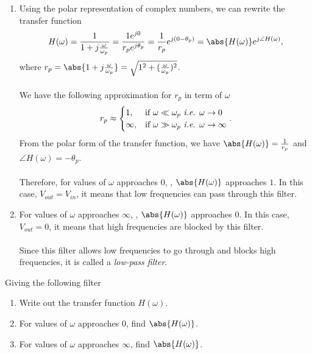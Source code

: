 \begin{enumerate}
{\begin{enumerate}
  \item Using the polar representation of complex numbers, we can rewrite the transfer function
    \[
      H(\omega) = \frac{1}{1 + j\frac{\omega}{\omega_p}}
      = \frac{1e^{j0}}{r_pe^{j\theta_p}}
      = \frac{1}{r_p}e^{j(0 - \theta_p)}
      = \abs{H(\omega)}e^{j\angle{H(\omega)}}
    ,\]
    where $r_p = \abs{1 + j\frac{\omega}{\omega_p}} = \sqrt{1^{2} + (\frac{\omega}{\omega_p})^{2}}$.
    \\
    \\
    We have the following approximation for $r_p$ in term of $\omega$
    \[
      r_p \approx
      \begin{cases}
        1,      & \text{if } \omega \ll \omega_p \text{ \it i.e. } \omega \rightarrow 0 \\
        \infty, & \text{if } \omega \gg \omega_p \text{ \it i.e. } \omega \rightarrow \infty
      \end{cases}
    .\]
    From the polar form of the transfer function, we have $\abs{H(\omega)} = \frac{1}{r_p}$ and $\angle{H(\omega) = - \theta_p}$.
    \\
    \\
    Therefore, for values of $\omega$ approaches $0$, , $\abs{H(\omega)}$ approaches $1$.
    In this case, $V_{out} = V_{in}$, it means that low frequencies can pass through this filter.

  \item For values of $\omega$ approaches $\infty$, , $\abs{H(\omega)}$ approaches $0$.
    In this case, $V_{out} = 0$, it means that high frequencies are blocked by this filter.
    \\
    \\
    Since this filter allows low frequencies to go through and blocks high frequencies, it is called a \emph{low-pass filter}.

\end{enumerate}
}



\qitem Giving the following filter



\begin{enumerate}
  \item Write out the transfer function $H(\omega)$.
  \item For values of $\omega$ approaches $0$, find $\abs{H(\omega)}$.
  \item For values of $\omega$ approaches $\infty$, find $\abs{H(\omega)}$.
\end{enumerate}


\end{enumerate}
